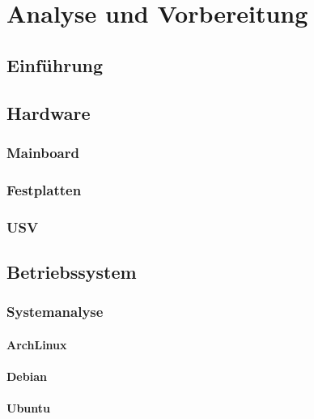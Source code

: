 \chapter{Analyse und Vorbereitung}

\section{Einführung}

\section{Hardware}
\subsection{Mainboard}

\subsection{Festplatten}

\subsection{USV}

\section{Betriebssystem}
\subsection{Systemanalyse}
\subsubsection{ArchLinux}

\subsubsection{Debian}

\subsubsection{Ubuntu}

